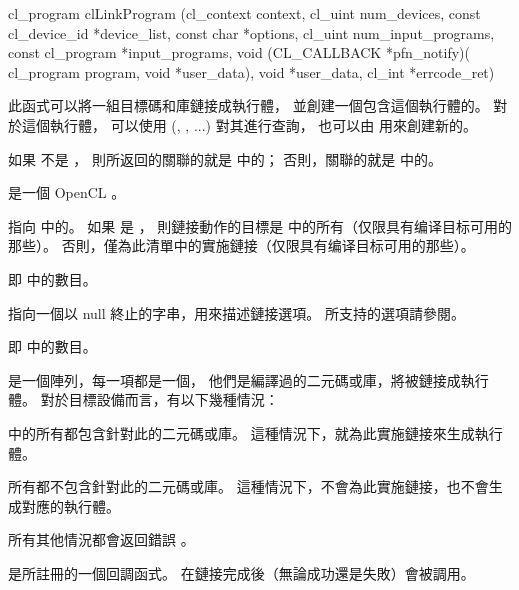 
\startCLFUNC
cl_program clLinkProgram (cl_context context,
			cl_uint num_devices,
			const cl_device_id *device_list,
			const char *options,
			cl_uint num_input_programs,
			const cl_program *input_programs,
			void (CL_CALLBACK *pfn_notify)(
						cl_program program,
						void *user_data),
			void *user_data,
			cl_int *errcode_ret)
\stopCLFUNC

此函式可以將一組目標碼和庫鏈接成執行體，
並創建一個包含這個執行體的。
對於這個執行體，
可以使用 (, , ...) 對其進行查詢，
也可以由  用來創建新的。

如果  不是 ，
則所返回的關聯的就是  中的；
否則，關聯的就是  中的。

 是一個 OpenCL 。

 指向  中的。
如果  是 ，
則鏈接動作的目標是  中的所有（仅限具有编译目标可用的那些）。
否則，僅為此清單中的實施鏈接（仅限具有编译目标可用的那些）。

 即  中的數目。

 指向一個以 null 終止的字串，用來描述鏈接選項。
所支持的選項請參閱。

 即  中的數目。

 是一個陣列，每一項都是一個，
他們是編譯過的二元碼或庫，將被鏈接成執行體。
對於目標設備而言，有以下幾種情況：
\startigBase
\item {} 中的所有都包含針對此的二元碼或庫。
這種情況下，就為此實施鏈接來生成執行體。

\item 所有都不包含針對此的二元碼或庫。
這種情況下，不會為此實施鏈接，也不會生成對應的執行體。

\item 所有其他情況都會返回錯誤 。
\stopigBase

 是所註冊的一個回調函式。
在鏈接完成後（無論成功還是失敗）會被調用。

